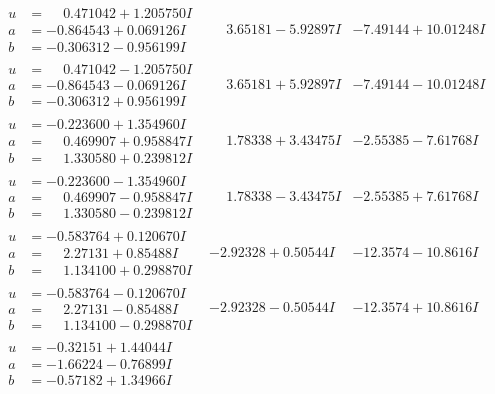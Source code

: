 \documentclass[1p]{elsarticle_modified}
\theoremstyle{definition}
\begin{document}
$$\begin{array}{c|c|c}
\begin{aligned}
u &= \phantom{-}0.471042 + 1.205750 I \\
a &= -0.864543 + 0.069126 I \\
b &= -0.306312 - 0.956199 I\end{aligned}
 & \phantom{-}3.65181 - 5.92897 I & -7.49144 + 10.01248 I \\ \hline\begin{aligned}
u &= \phantom{-}0.471042 - 1.205750 I \\
a &= -0.864543 - 0.069126 I \\
b &= -0.306312 + 0.956199 I\end{aligned}
 & \phantom{-}3.65181 + 5.92897 I & -7.49144 - 10.01248 I \\ \hline\begin{aligned}
u &= -0.223600 + 1.354960 I \\
a &= \phantom{-}0.469907 + 0.958847 I \\
b &= \phantom{-}1.330580 + 0.239812 I\end{aligned}
 & \phantom{-}1.78338 + 3.43475 I & -2.55385 - 7.61768 I \\ \hline\begin{aligned}
u &= -0.223600 - 1.354960 I \\
a &= \phantom{-}0.469907 - 0.958847 I \\
b &= \phantom{-}1.330580 - 0.239812 I\end{aligned}
 & \phantom{-}1.78338 - 3.43475 I & -2.55385 + 7.61768 I \\ \hline\begin{aligned}
u &= -0.583764 + 0.120670 I \\
a &= \phantom{-}2.27131 + 0.85488 I \\
b &= \phantom{-}1.134100 + 0.298870 I\end{aligned}
 & -2.92328 + 0.50544 I & -12.3574 - 10.8616 I \\ \hline\begin{aligned}
u &= -0.583764 - 0.120670 I \\
a &= \phantom{-}2.27131 - 0.85488 I \\
b &= \phantom{-}1.134100 - 0.298870 I\end{aligned}
 & -2.92328 - 0.50544 I & -12.3574 + 10.8616 I \\ \hline\begin{aligned}
u &= -0.32151 + 1.44044 I \\
a &= -1.66224 - 0.76899 I \\
b &= -0.57182 + 1.34966 I\end{aligned}

\end{array}$$
\end{document}
